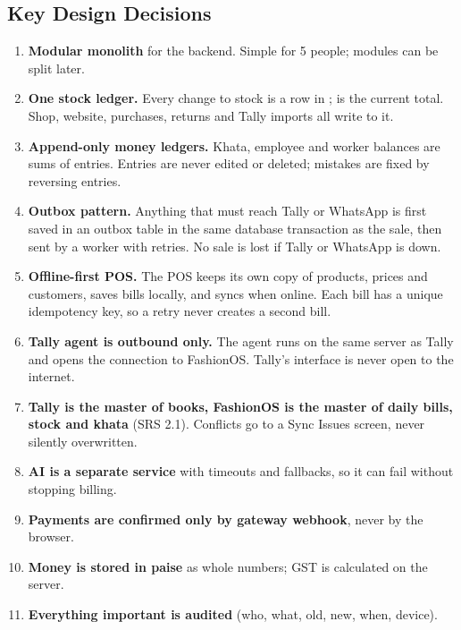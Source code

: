 \documentclass[11pt,a4paper]{article}
\newcommand{\code}[1]{\texttt{\detokenize{#1}}}
\begin{document}
\subsection{Key Design Decisions}
\begin{enumerate}
\item \textbf{Modular monolith} for the backend. Simple for 5 people; modules can be split later.
\item \textbf{One stock ledger.} Every change to stock is a row in \code{stock_movements}; \code{stock_levels} is the current total. Shop, website, purchases, returns and Tally imports all write to it.
\item \textbf{Append-only money ledgers.} Khata, employee and worker balances are sums of entries. Entries are never edited or deleted; mistakes are fixed by reversing entries.
\item \textbf{Outbox pattern.} Anything that must reach Tally or WhatsApp is first saved in an outbox table in the same database transaction as the sale, then sent by a worker with retries. No sale is lost if Tally or WhatsApp is down.
\item \textbf{Offline-first POS.} The POS keeps its own copy of products, prices and customers, saves bills locally, and syncs when online. Each bill has a unique idempotency key, so a retry never creates a second bill.
\item \textbf{Tally agent is outbound only.} The agent runs on the same server as Tally and opens the connection to FashionOS. Tally's interface is never open to the internet.
\item \textbf{Tally is the master of books, FashionOS is the master of daily bills, stock and khata} (SRS 2.1). Conflicts go to a Sync Issues screen, never silently overwritten.
\item \textbf{AI is a separate service} with timeouts and fallbacks, so it can fail without stopping billing.
\item \textbf{Payments are confirmed only by gateway webhook}, never by the browser.
\item \textbf{Money is stored in paise} as whole numbers; GST is calculated on the server.
\item \textbf{Everything important is audited} (who, what, old, new, when, device).
\end{enumerate}
\end{document}
